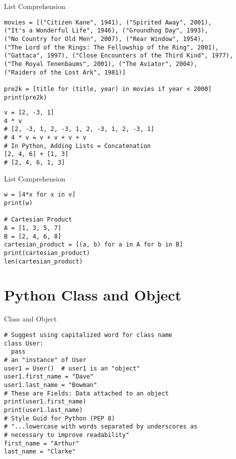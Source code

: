 \documentclass{beamer}
\begin{document}
\begin{frame}[fragile]{List Comprehension}
\begin{verbatim}
movies = [("Citizen Kane", 1941), ("Spirited Away", 2001), 
("It's a Wonderful Life", 1946), ("Groundhog Day", 1993), 
("No Country for Old Men", 2007), ("Rear Window", 1954), 
("The Lord of the Rings: The Fellowship of the Ring", 2001), 
("Gattaca", 1997), ("Close Encounters of the Third Kind", 1977), 
("The Royal Tenenbaums", 2001), ("The Aviator", 2004), 
("Raiders of the Lost Ark", 1981)]

pre2k = [title for (title, year) in movies if year < 2000]
print(pre2k)
\end{verbatim}
\vspace{-2.5em}
\begin{verbatim}
v = [2, -3, 1]
4 * v
# [2, -3, 1, 2, -3, 1, 2, -3, 1, 2, -3, 1]
# 4 * v = v + v + v + v
# In Python, Adding Lists = Concatenation
[2, 4, 6] + [1, 3]
# [2, 4, 6, 1, 3]
\end{verbatim}
\end{frame}

\begin{frame}[fragile]{List Comprehension}
\begin{verbatim}
w = [4*x for x in v]
print(w)

# Cartesian Product
A = [1, 3, 5, 7]
B = [2, 4, 6, 8]
cartesian_product = [(a, b) for a in A for b in B]
print(cartesian_product)
len(cartesian_product)
\end{verbatim}
\end{frame}

\section{Python Class and Object}

\begin{frame}[fragile]{Class and Object}
\begin{verbatim}
# Suggest using capitalized word for class name
class User:
  pass
# an "instance" of User
user1 = User()  # user1 is an "object"
user1.first_name = "Dave"
user1.last_name = "Bowman"
# These are Fields: Data attached to an object
print(user1.first_name)
print(user1.last_name)
# Style Guid for Python (PEP 8)
# "...lowercase with words separated by underscores as
# necessary to improve readability"
first_name = "Arthur"
last_name = "Clarke"
\end{verbatim}
\end{frame}
\end{document}
